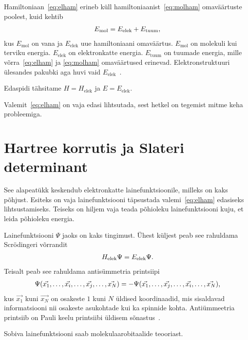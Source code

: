 \documentclass[12pt]{report}
\begin{document}
Hamiltoniaan~\eqref{eq:elham} erineb küll hamiltoniaanist~\eqref{eq:molham} omaväärtuste poolest, kuid kehtib
\begin{align}
    E_\text{mol} = E_\text{elek} + E_\text{tuum} \rlap{,}
\end{align}
kus \(E_\text{mol}\) on vana ja \(E_\text{elek}\) uue hamiltoniaani omaväärtus.
\(E_\text{mol}\) on molekuli kui terviku energia.
\(E_\text{elek}\) on elektronkatte energia.
\(E_\text{tuum}\) on tuumade energia, mille võrra~\eqref{eq:elham} ja \eqref{eq:molham} omaväärtused erinevad.
Elektronstruktuuri ülesandes pakubki aga huvi vaid \(E_\text{elek}\)~\cite{szabo+ostlund}.

Edaspidi tähsitame \(H = H_\text{elek}\) ja \(E = E_\text{elek}\).

Valemit~\eqref{eq:elham} on vaja edasi lihtsutada, sest hetkel on tegemist mitme keha probleemiga.

\section{Hartree korrutis ja Slateri determinant}\label{sec:hpsd}

See alapeatükk keskendub elektronkatte lainefunktsioonile, milleks on kaks põhjust.
Esiteks on vaja lainefunktsiooni täpsustada valemi~\eqref{eq:elham} edasiseks lihtsustamiseks.
Teiseks on hiljem vaja teada põhioleku lainefunktsiooni kuju, et leida põhioleku energia.

Lainefunktsiooni \(\Psi\) jaoks on kaks tingimust.
Ühest küljest peab see rahuldama Scrödingeri võrrandit
\begin{align}
    H_\text{elek} \Psi = E_\text{elek} \Psi \rlap{.}
\end{align}
Teisalt peab see rahuldama antisümmetria printsiipi
\begin{align}
    \Psi(\vec{x_1}, \ldots, \vec{x_i}, \ldots, \vec{x_j}, \ldots, \vec{x_N})
    = -\Psi(\vec{x_1}, \ldots, \vec{x_j}, \ldots, \vec{x_i}, \ldots, \vec{x_N}) \rlap{,}
\end{align}
kus \(\vec{x_1}\) kuni \(\vec{x_N}\) on osakeste \(1\) kuni \(N\) üldised koordinaadid, mis sisaldavad informatsiooni nii osakeste asukohtade kui ka spinnide kohta.
Antiümmeetria printsiib on Pauli keelu printsiibi üldisem sõnastus~\cite{szabo+ostlund}.

Sobiva lainefunktsiooni saab molekulaarobitaalide teooriast.
\end{document}
